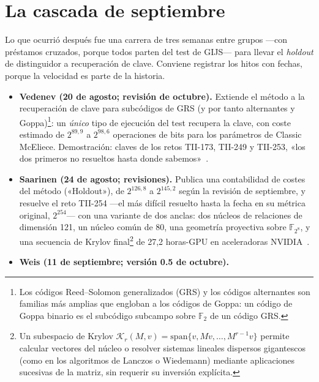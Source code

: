 \documentclass[11pt,a4paper,oneside]{report}
\newcommand{\F}{\mathbb{F}}
\newcommand{\GF}[1]{\mathbb{F}_{#1}}
\begin{document}
\section{La cascada de septiembre}\label{sec:2026-cascada}

Lo que ocurrió después fue una carrera de tres semanas entre grupos
---con préstamos cruzados, porque todos parten del test de GIJS---
para llevar el \emph{holdout} de distinguidor a recuperación de
clave. Conviene registrar los hitos con fechas, porque la velocidad
es parte de la historia.

\begin{itemize}[leftmargin=1.5em,itemsep=3pt]
  \item \textbf{Vedenev (20 de agosto; revisión de octubre).} Extiende
        el método a la recuperación de clave para subcódigos de
        GRS (y por tanto alternantes y Goppa)\footnote{Los códigos
        Reed--Solomon generalizados (GRS) y los códigos alternantes son
        familias más amplias que engloban a los códigos de Goppa: un código
        de Goppa binario es el subcódigo subcampo sobre $\F_2$ de un código
        GRS.}: un \emph{único} tipo
        de ejecución del test recupera la clave, con coste estimado
        de $2^{89{,}9}$ a $2^{98{,}6}$ operaciones de bits para los
        parámetros de Classic McEliece. Demostración: claves de los
        retos TII-173, TII-249 y TII-253, «los dos primeros no
        resueltos hasta donde sabemos»~\cite{vedenev2026}.
  \item \textbf{Saarinen (24 de agosto; revisiones).} Publica una
        contabilidad de costes del método («Holdout»), de $2^{126{,}8}$
        a $2^{145{,}2}$ según la revisión de septiembre, y resuelve
        el reto TII-254 ---el más difícil resuelto hasta la fecha
        en su métrica original, $2^{254}$--- con una variante de dos
        anclas: dos núcleos de relaciones de dimensión 121, un
        núcleo común de 80, una geometría proyectiva sobre
        $\GF{2^8}$, y una secuencia de Krylov final\footnote{Un
        subespacio de Krylov $\mathcal{K}_r(M, v) = \mathrm{span}\{v, Mv,
        \dots, M^{r-1}v\}$ permite calcular vectores del núcleo o resolver
        sistemas lineales dispersos gigantescos (como en los algoritmos de
        Lanczos o Wiedemann) mediante aplicaciones sucesivas de la matriz,
        sin requerir su inversión explícita.} de 27{,}2
        horas-GPU en aceleradoras NVIDIA~\cite{saarinen2026a,saarinen2026b}.
  \item \textbf{Weis (11 de septiembre; versión 0.5 de octubre).}

\end{itemize}
\end{document}
